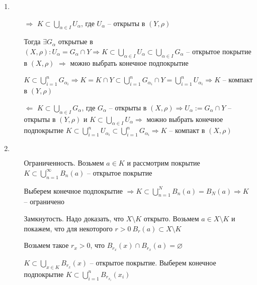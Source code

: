 \documentclass[12pt]{article}
\begin{document}
\begin{enumerate}
    \item 
    
    \begin{itemize}
        \item[$\Rightarrow$] $K \subset \bigcup\limits_{\alpha \in I} U_\alpha$, где $U_\alpha$ -- открыты в $(Y, \rho)$
        
        Тогда $\exists G_\alpha$ открытые в $(X, \rho) : U_\alpha = G_\alpha \cap Y \Rightarrow K \subset \bigcup\limits_{\alpha \in I} U_\alpha \subset \bigcup\limits_{\alpha \in I} G_\alpha$ -- открытое покрытие в $(X, \rho)$ $\Rightarrow$ можно выбрать конечное подпокрытие 

        $K \subset \bigcup\limits_{i = 1}^n G_{\alpha_i} \Rightarrow K = K \cap Y \subset \bigcup\limits_{i = 1}^n G_{\alpha_i} \cap Y = \bigcup\limits_{i = 1}^n U_{\alpha_i} \Rightarrow K$ -- компакт в $(Y, \rho)$

        \item[$\Leftarrow$] $K \subset \bigcup\limits_{\alpha \in I} G_\alpha$, где $G_\alpha$ -- открыты в $(X, \rho) \Rightarrow U_\alpha := G_\alpha \cap Y$ -- открыты в $(Y, \rho)$ и $K \subset \bigcup\limits_{\alpha \in I} U_\alpha \Rightarrow$ можно выбрать конечное подпокрытие $K \subset \bigcup\limits_{i = 1}^n U_{\alpha_i} \subset \bigcup\limits_{i = 1}^n G_{\alpha_i} \Rightarrow K$ -- компакт в $(X, \rho)$
    \end{itemize}

    \item $\left. \right.$
    
    \begin{itemize}
        \item[Ограниченность.] Возьмем $a \in K$ и рассмотрим покрытие $K \subset \bigcup\limits_{n = 1}^\infty B_n(a)$ -- открытое покрытие
        
        Выберем конечное подпокрытие $\Rightarrow K \subset \bigcup\limits_{n = 1}^N B_n(a) = B_N(a) \Rightarrow K$ -- ограничено

        \item[Замкнутость.] Надо доказать, что $X \setminus K$ открыто. Возьмем $a \in X \setminus K$ и покажем, что для некоторого $r > 0\ B_r(a) \subset X \setminus K$
        
        Возьмем такое $r_x > 0$, что $B_{r_x}(x) \cap B_{r_x}(a) = \varnothing$

        $K \subset \bigcup\limits_{x \in K} B_{r_x}(x)$ -- открытое покрытие. Выберем конечное подпокрытие $K \subset \bigcup\limits_{i = 1}^n B_{r_{x_i}}(x_i)$


\end{itemize}
\end{enumerate}
\end{document}

